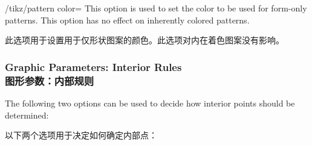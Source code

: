 \begin{key}{/tikz/pattern color=}
    This option is used to set the color to be used for form-only patterns.
    This option has no effect on inherently colored patterns.
    
    此选项用于设置用于仅形状图案的颜色。此选项对内在着色图案没有影响。

\begin{codeexample}[preamble={\usetikzlibrary{patterns}}]
\end{codeexample}

\begin{codeexample}[preamble={\usetikzlibrary{patterns}}]
\end{codeexample}
\end{key}


\subsubsection{Graphic Parameters: Interior Rules\\图形参数：内部规则}

The following two options can be used to decide how interior points should be
determined:

以下两个选项用于决定如何确定内部点：

